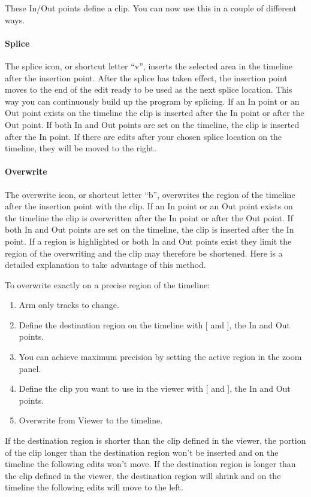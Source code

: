 \noindent These In/Out points define a clip.  You can now use this in a couple of different ways.

\paragraph{Splice} The splice icon, or shortcut letter “v”, inserts the selected area in the timeline after the insertion point.  After the splice has taken effect, the insertion point moves to the end of the edit ready to be used as the next splice location. This way you can continuously build up the program by splicing.
If an In point or an Out point exists on the timeline the clip is inserted after the In point or after the Out point. If both In and Out points are set on the timeline, the clip is inserted after the In point. If there are edits after your chosen splice location on the timeline, they will be moved to the right.

\paragraph{Overwrite} The overwrite icon, or shortcut letter “b”, overwrites the region of the timeline after the insertion point with the clip. If an In point or an Out point exists on the timeline the clip is overwritten after the In point or after the Out point. If both In and Out points are set on the timeline, the clip is inserted after the In point. If a region is highlighted or both In and Out points exist they limit the region of the overwriting and the clip may therefore be shortened. Here is a detailed explanation to take advantage of this method.

To overwrite exactly on a precise region of the timeline:

\begin{enumerate} [noitemsep]
    \item Arm only tracks to change.
    \item Define the destination region on the timeline with [ and ], the In and Out points.
    \item You can achieve maximum precision by setting the active region in the zoom panel.
    \item Define the clip you want to use in the viewer with [ and ], the In and Out points.
    \item Overwrite from Viewer to the timeline.
\end{enumerate}

If the destination region is shorter than the clip defined in the viewer, the portion of the clip longer than the destination region won't be inserted and on the timeline the following edits won't move.
If the destination region is longer than the clip defined in the viewer, the destination region will shrink and on the timeline the following edits will move to the left.

